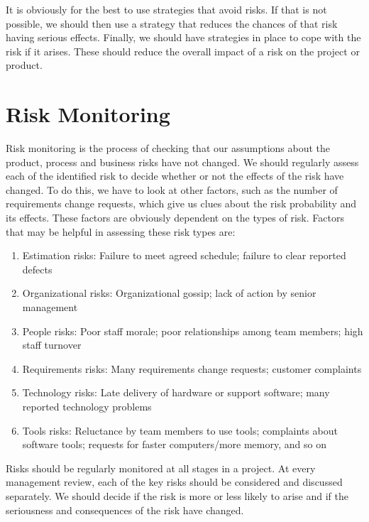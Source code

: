 It is obviously for the best to use strategies that avoid risks. If that is not possible, we should then use a strategy that reduces the chances of that risk having serious effects. Finally, we should have strategies in place to cope with the risk if it arises. These should reduce the overall impact of a risk on the project or product.

\section{Risk Monitoring}
Risk monitoring is the process of checking that our assumptions about the product, process and business risks have not changed. We should regularly assess each of the identified risk to decide whether or not the effects of the risk have changed. To do this, we have to look at other factors, such as the number of requirements change requests, which give us clues about the risk probability and its effects. These factors are obviously dependent on the types of risk. Factors that may be helpful in assessing these risk types are:
\begin{enumerate}
    \item Estimation risks: Failure to meet agreed schedule; failure to clear reported defects
    \item Organizational risks: Organizational gossip; lack of action by senior management
    \item People risks: Poor staff morale; poor relationships among team members; high staff turnover
    \item Requirements risks: Many requirements change requests; customer complaints
    \item Technology risks: Late delivery of hardware or support software; many reported technology problems
    \item Tools risks: Reluctance by team members to use tools; complaints about software tools; requests for faster computers/more memory, and so on
\end{enumerate}

Risks should be regularly monitored at all stages in a project. At every management review, each of the key risks should be considered and discussed separately. We should decide if the risk is more or less likely to arise and if the seriousness and consequences of the risk have changed.
